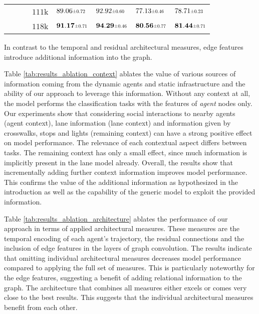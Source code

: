 \documentclass[letterpaper, 10 pt, journal, twoside]{IEEEtran}
\newcommand\scalemath[2]{\scalebox{#1}{\mbox{\ensuremath{\displaystyle #2}}}}
\begin{document}
\begin{table}[!t]
{\begin{tabular}{p{0.55cm} p{0.5cm} p{1.10cm} p{0.8cm} p{1.15cm} p{1.15cm} p{1.15cm} p{1.15cm}}
			\centering \checkmark                                          & \centering \checkmark &                        & $111$k                    & $89.06\scalemath{0.7}{\pm 0.72}$          & $92.92\scalemath{0.7}{\pm 0.60}$          & $77.13\scalemath{0.7}{\pm 0.46}$          & $78.71\scalemath{0.7}{\pm 0.23}$          \\
			\centering \checkmark                                          & \centering \checkmark & \centering \checkmark  & $118$k                    & $\mathbf{91.17}\scalemath{0.7}{\pm 0.71}$ & $\mathbf{94.29}\scalemath{0.7}{\pm 0.46}$ & $\mathbf{80.56}\scalemath{0.7}{\pm 0.77}$ & $\mathbf{81.44}\scalemath{0.7}{\pm 0.71}$ \\ \bottomrule
		\end{tabular}}
	\begin{flushleft}
		\footnotemark[2]In contrast to the temporal and residual architectural measures, edge features introduce additional information into the graph.
	\end{flushleft}
    \vspace{-0.3cm}
\end{table}
 
Table \ref{tab:results_ablation_context} ablates the value of various sources of information coming from the dynamic agents and static infrastructure and the ability of our approach to leverage this information.
Without any context at all, the model performs the classification tasks with the features of \textit{agent} nodes only.
Our experiments show that considering social interactions to nearby agents (agent context), lane information (lane context) and information given by crosswalks, stops and lights (remaining context) can have a strong positive effect on model performance.
The relevance of each contextual aspect differs between tasks.
The remaining context has only a small effect, since much information is implicitly present in the lane model already.
Overall, the results show that incrementally adding further context information improves model performance.
This confirms the value of the additional information as hypothesized in the introduction as well as the capability of the generic model to exploit the provided information.

Table \ref{tab:results_ablation_architecture} ablates the performance of our approach in terms of applied architectural measures.
These measures are the temporal encoding of each agent's trajectory, the residual connections and the inclusion of edge features in the layers of graph convolution.
The results indicate that omitting individual architectural measures decreases model performance compared to applying the full set of measures.
This is particularly noteworthy for the edge features, suggesting a benefit of adding relational information to the graph.
The architecture that combines all measures either excels or comes very close to the best results.
This suggests that the individual architectural measures benefit from each other.
\end{document}
